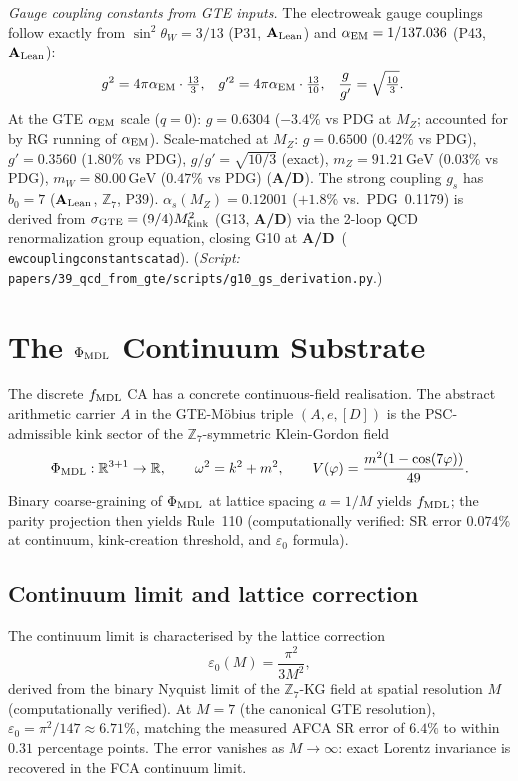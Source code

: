 \documentclass[11pt]{article}
\theoremstyle{remark}
\newcommand{\ZS}{\mathbb{Z}_7}
\newcommand{\fmdl}{f_{\rm MDL}}
\newcommand{\lean}[1]{%
  \penalty-100
  \begingroup\def\_{\textunderscore\allowbreak}\texttt{#1}\endgroup}
\newcommand{\sinwsq}{\sin^2\!\theta_W}
\newcommand{\phimdl}{\Phi_{\rm MDL}}
\newcommand{\epszero}{\varepsilon_0}
\newcommand{\CatAL}{\ensuremath{\textbf{A}_{\rm Lean}}}
\newcommand{\CatAD}{\textbf{A/D}}
\begin{document}
\noindent\textit{Gauge coupling constants from GTE inputs.}\enspace
The electroweak gauge couplings follow exactly from $\sinwsq = 3/13$ (P31,
\CatAL) and $\alpha_{\rm EM} = 1/137.036$ (P43, \CatAL):
\begin{align}
  g^2 &= 4\pi\alpha_{\rm EM}\cdot\tfrac{13}{3}, &
  g'^2 &= 4\pi\alpha_{\rm EM}\cdot\tfrac{13}{10}, &
  \frac{g}{g'} &= \sqrt{\tfrac{10}{3}}.
\end{align}
At the GTE $\alpha_{\rm EM}$ scale ($q=0$): $g = 0.6304$ ($-3.4\%$ vs PDG at
$M_Z$; accounted for by RG running of $\alpha_{\rm EM}$).
Scale-matched at $M_Z$: $g = 0.6500$ ($0.42\%$ vs PDG), $g' = 0.3560$ ($1.80\%$ vs PDG),
$g/g' = \sqrt{10/3}$ (exact), $m_Z = 91.21\,\text{GeV}$
($0.03\%$ vs PDG), $m_W = 80.00\,\text{GeV}$ ($0.47\%$ vs PDG) (\CatAD).
The strong coupling $g_s$ has $b_0 = 7$ (\CatAL, $\mathbb{Z}_7$, P39).
$\alpha_s(M_Z) = 0.12001$ ($+1.8\%$ vs.\ PDG~0.1179) is derived from $\sigma_{\rm GTE} = (9/4)M_{\rm kink}^2$ (G13, \CatAD) via
the 2-loop QCD renormalization group equation, closing G10 at \CatAD\
(\lean{ew\_coupling\_constants\_catad}).
(\textit{Script:} \texttt{papers/39\_qcd\_from\_gte/scripts/g10\_gs\_derivation.py}.)

\section{The \texorpdfstring{$\Phi_{\rm MDL}$}{PhiMDL} Continuum Substrate}
\label{sec:phimdl}

The discrete $\fmdl$ CA has a concrete continuous-field realisation.
The abstract arithmetic carrier $A$ in the GTE-M\"obius triple $(A,e,[D])$
is the PSC-admissible kink sector of the $\ZS$-symmetric Klein-Gordon field
\[
  \phimdl : \mathbb{R}^{3+1} \to \mathbb{R}, \qquad
  \omega^2 = k^2 + m^2, \qquad
  V(\varphi) = \frac{m^2(1 - \cos(7\varphi))}{49}.
\]
Binary coarse-graining of $\phimdl$ at lattice spacing $a = 1/M$ yields $\fmdl$;
the parity projection then yields Rule~110 (computationally verified: SR error $0.074\%$ at
continuum, kink-creation threshold, and $\epszero$ formula).

\subsection{Continuum limit and lattice correction}

The continuum limit is characterised by the lattice correction
\begin{equation}
  \epszero(M) = \frac{\pi^2}{3M^2},
  \label{eq:eps0}
\end{equation}
derived from the binary Nyquist limit of the $\ZS$-KG field at spatial resolution $M$
(computationally verified).
At $M = 7$ (the canonical GTE resolution), $\epszero = \pi^2/147 \approx 6.71\%$,
matching the measured AFCA SR error of $6.4\%$ to within $0.31$ percentage points.
The error vanishes as $M \to \infty$: exact Lorentz invariance is recovered in the
FCA continuum limit.
\end{document}
